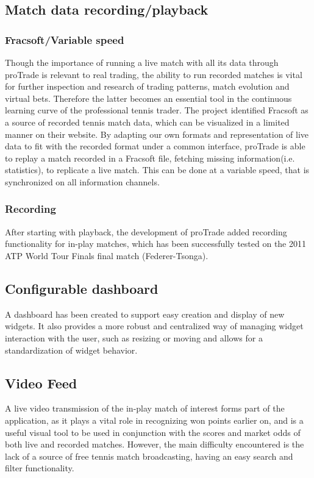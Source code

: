 \documentclass[10pt]{report}
\begin{document}
\subsection {Match data recording/playback}
\subsubsection {Fracsoft/Variable speed}
Though the importance of running a live match with all its data through proTrade is relevant to real trading, the ability to run recorded matches is vital for further inspection and research of trading patterns, match evolution and virtual bets. Therefore the latter becomes an essential tool in the continuous learning curve of the professional tennis trader. The project identified Fracsoft as a source of recorded tennis match data, which can be visualized in a limited manner on their website. By adapting our own formats and representation of live data to fit with the recorded format under a common interface, proTrade is able to replay a match recorded in a Fracsoft file, fetching missing information(i.e. statistics), to replicate a live match. This can be done at a variable speed, that is synchronized on all information channels.  
\subsubsection {Recording}
After starting with playback, the development of proTrade added recording functionality for in-play matches, which has been successfully tested on the 2011 ATP World Tour Finals final match (Federer-Tsonga).   

\subsection {Configurable dashboard}
A dashboard has been created to support easy creation and display of new widgets. It also provides a more robust and centralized way of managing widget interaction with the user, such as resizing or moving and allows for a standardization of widget behavior.

\subsection {Video Feed}
A live video transmission of the in-play match of interest forms part of the application, as it plays a vital role in recognizing won points earlier on, and is a useful visual tool to be used in conjunction with the scores and market odds of both live and recorded matches. However, the main difficulty encountered is the lack of a source of free tennis match broadcasting, having an easy search and filter functionality.
\end{document}
